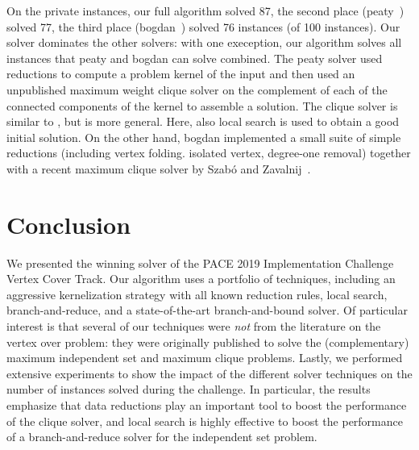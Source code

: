 \documentclass[twoside,leqno,twocolumn]{article}
\begin{document}
On the private instances, our full algorithm solved 87, the second place (\textsf{peaty}~\cite{james_trimble_2019_3082356}) solved 77, the third place (\textsf{bogdan}~\cite{zbogdan_2019_3228802}) solved 76 instances (of 100 instances). Our solver dominates the other solvers: with one exeception, our algorithm solves all instances that peaty and bogdan can solve combined. The \textsf{peaty} solver used reductions to compute a problem kernel of the input and then used an unpublished maximum weight clique solver on the complement of each of the connected components of the kernel to assemble a solution. The clique solver is similar to \cite{DBLP:conf/aaai/LiQ10}, but is more general. Here, also local search is used to obtain a good initial solution. On the other hand, \textsf{bogdan} implemented a small suite of simple reductions (including vertex folding. isolated vertex, degree-one removal) together with a recent maximum clique solver by Szab\'o and Zavalnij~\cite{szabo2018different}. 


\section{Conclusion}
We presented the winning solver of the PACE 2019 Implementation Challenge Vertex Cover Track. Our algorithm uses a portfolio of techniques, including an aggressive kernelization strategy with all known reduction rules, local search, branch-and-reduce, and a state-of-the-art branch-and-bound solver. Of particular interest is that several of our techniques were \emph{not} from the literature on the vertex over problem: they were originally published to solve the (complementary) maximum independent set and maximum clique problems. Lastly, we performed extensive experiments to show the impact of the different solver techniques on the number of instances solved during the challenge. In particular, the results emphasize that data reductions play an important tool to boost the performance of the clique solver, and local search is highly effective to boost the performance of a branch-and-reduce solver for the independent set problem.



\vfill
\end{document}
